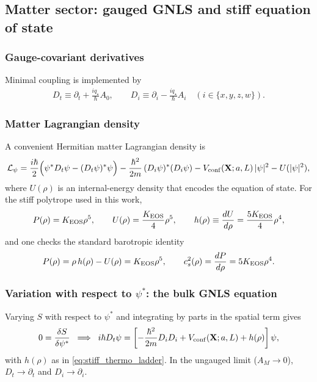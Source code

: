 \documentclass[11pt]{article}
\newcommand{\qstar}{q_\star}
\begin{document}
\subsection{Matter sector: gauged GNLS and stiff equation of state}
\subsubsection{Gauge-covariant derivatives}
Minimal coupling is implemented by
\begin{align}
D_t \equiv \partial_t + \frac{i \qstar}{\hbar}A_0, \qquad
D_i \equiv \partial_i - \frac{i \qstar}{\hbar}A_i \quad (i\in\{x,y,z,w\}).
\label{eq:cov_derivs}
\end{align}

\subsubsection{Matter Lagrangian density}
A convenient Hermitian matter Lagrangian density is
\begin{align}
\mathcal{L}_\psi
=
\frac{i\hbar}{2}\Big(\psi^\ast D_t\psi - (D_t\psi)^\ast\psi\Big)
-\frac{\hbar^2}{2m}\,(D_i\psi)^\ast (D_i\psi)
- V_{\rm conf}(\mathbf{X};a,L)\,|\psi|^2
- U(|\psi|^2),
\label{eq:Lpsi}
\end{align}
where $U(\rho)$ is an internal-energy density that encodes the equation of state.
For the stiff polytrope used in this work,
\begin{align}
P(\rho) = K_{\rm EOS}\rho^5,
\qquad
U(\rho)=\frac{K_{\rm EOS}}{4}\rho^5,
\qquad
h(\rho)\equiv \frac{dU}{d\rho}=\frac{5K_{\rm EOS}}{4}\rho^4,
\label{eq:stiff_thermo_ladder}
\end{align}
and one checks the standard barotropic identity
\begin{align}
P(\rho)=\rho\,h(\rho)-U(\rho)=K_{\rm EOS}\rho^5,
\qquad
c_s^2(\rho)=\frac{dP}{d\rho}=5K_{\rm EOS}\rho^4.
\end{align}

\subsubsection{Variation with respect to $\psi^\ast$: the bulk GNLS equation}
Varying $S$ with respect to $\psi^\ast$ and integrating by parts in the spatial
term gives
\begin{align}
0=\frac{\delta S}{\delta \psi^\ast}
\;\;\Longrightarrow\;\;
i\hbar D_t\psi
=
\left[
-\frac{\hbar^2}{2m}D_iD_i
+V_{\rm conf}(\mathbf{X};a,L)
+h(\rho)
\right]\psi,
\label{eq:gnls_gauged}
\end{align}
with $h(\rho)$ as in \eqref{eq:stiff_thermo_ladder}.  In the ungauged limit
($A_M\to 0$), $D_t\to\partial_t$ and $D_i\to\partial_i$.
\end{document}
